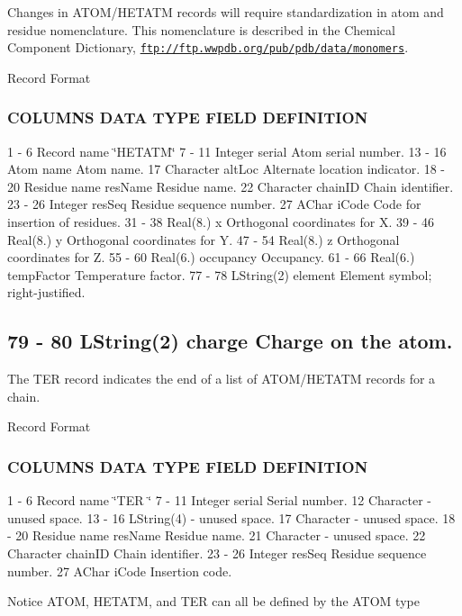 Changes in A\+T\+O\+M/\+H\+E\+T\+A\+TM records will require standardization in atom and residue nomenclature. This nomenclature is described in the Chemical Component Dictionary, \href{ftp://ftp.wwpdb.org/pub/pdb/data/monomers}{\tt ftp\+://ftp.\+wwpdb.\+org/pub/pdb/data/monomers}.

Record Format

\subsubsection*{C\+O\+L\+U\+M\+NS D\+A\+TA T\+Y\+PE F\+I\+E\+LD D\+E\+F\+I\+N\+I\+T\+I\+ON }

1 -\/ 6 Record name \char`\"{}\+H\+E\+T\+A\+T\+M\char`\"{} 7 -\/ 11 Integer serial Atom serial number. 13 -\/ 16 Atom name Atom name. 17 Character alt\+Loc Alternate location indicator. 18 -\/ 20 Residue name res\+Name Residue name. 22 Character chain\+ID Chain identifier. 23 -\/ 26 Integer res\+Seq Residue sequence number. 27 A\+Char i\+Code Code for insertion of residues. 31 -\/ 38 Real(8.) x Orthogonal coordinates for X. 39 -\/ 46 Real(8.) y Orthogonal coordinates for Y. 47 -\/ 54 Real(8.) z Orthogonal coordinates for Z. 55 -\/ 60 Real(6.) occupancy Occupancy. 61 -\/ 66 Real(6.) temp\+Factor Temperature factor. 77 -\/ 78 L\+String(2) element Element symbol; right-\/justified. \subsection*{79 -\/ 80 L\+String(2) charge Charge on the atom. }

The T\+ER record indicates the end of a list of A\+T\+O\+M/\+H\+E\+T\+A\+TM records for a chain.

Record Format

\subsubsection*{C\+O\+L\+U\+M\+NS D\+A\+TA T\+Y\+PE F\+I\+E\+LD D\+E\+F\+I\+N\+I\+T\+I\+ON }

1 -\/ 6 Record name \char`\"{}\+T\+E\+R   \char`\"{} 7 -\/ 11 Integer serial Serial number. 12 Character -\/ unused space. 13 -\/ 16 L\+String(4) -\/ unused space. 17 Character -\/ unused space. 18 -\/ 20 Residue name res\+Name Residue name. 21 Character -\/ unused space. 22 Character chain\+ID Chain identifier. 23 -\/ 26 Integer res\+Seq Residue sequence number. 27 A\+Char i\+Code Insertion code.

Notice A\+T\+OM, H\+E\+T\+A\+TM, and T\+ER can all be defined by the A\+T\+OM type \mbox{\label{interfacemolreader_1_1read_ace14cc5017fcc772377477cb86aebbbe}} 
